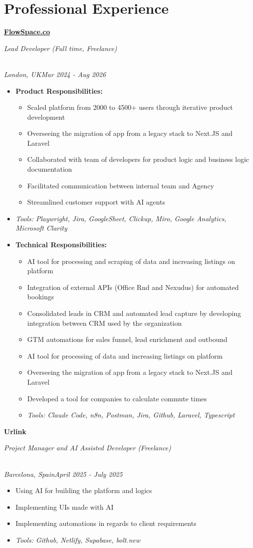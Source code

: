 \documentclass[a4paper,10pt]{article}
\newcommand{\role}[4]{\vspace{3pt}\noindent\hspace{0.6em}\parbox[t]{0.38\textwidth}{\raggedright\textbf{#1}}\hfill\parbox[t]{0.58\textwidth}{\raggedleft\textit{#2}}\\{\textit{#3}\hfill\textit{#4}}\vspace{1pt}}
\begin{document}
\section{Professional Experience}
\role{\href{https://flowspace.co}{FlowSpace.co}}{Lead Developer (Full time, Freelance)}{London, UK}{Mar 2024 - Aug 2026}
\begin{itemize}
\item \textbf{Product Responsibilities:}
\begin{itemize}[label=-]
\item Scaled platform from 2000 to 4500+ users through iterative product development
\item Overseeing the migration of app from a legacy stack to Next.JS and Laravel
\item Collaborated with team of developers for product logic and business logic documentation
\item Facilitated communication between internal team and Agency
\item Streamlined customer support with AI agents
\end{itemize}
\item \textit{Tools: Playwright, Jira, GoogleSheet, Clickup, Miro, Google Analytics, Microsoft Clarity}
\item \textbf{Technical Responsibilities:}
\begin{itemize}[label=-]
\item AI tool for processing and scraping of data and increasing listings on platform
\item Integration of external APIs (Office Rnd and Nexudus) for automated bookings
\item Consolidated leads in CRM and automated lead capture by developing integration between CRM used by the organization
\item GTM automations for sales funnel, lead enrichment and outbound
\item AI tool for processing of data and increasing listings on platform
\item Overseeing the migration of app from a legacy stack to Next.JS and Laravel
\item Developed a tool for companies to calculate commute times
\item \textit{Tools: Claude Code, n8n, Postman, Jira, Github, Laravel, Typescript}
\end{itemize}
\end{itemize}

\role{Urlink}{Project Manager and AI Assisted Developer (Freelance)}{Barcelona, Spain}{April 2025 - July 2025}
\begin{itemize}
\item Using AI for building the platform and logics
\item Implementing UIs made with AI
\item Implementing automations in regards to client requirements
\item \textit{Tools: Github, Netlify, Supabase, bolt.new}
\end{itemize}
\end{document}
